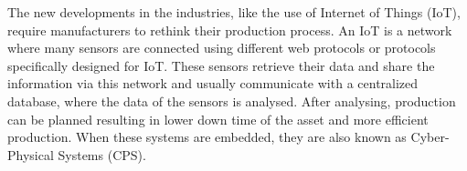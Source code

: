 The new developments in the industries, like the use of Internet of Things (IoT), require manufacturers to rethink their production process. An IoT is a network where many sensors are connected using different web protocols or protocols specifically designed for IoT. These sensors retrieve their data and share the information via this network and usually communicate with a centralized database, where the data of the sensors is analysed. After analysing, production can be planned resulting in lower down time of the asset and more efficient production. When these systems are embedded, they are also known as Cyber-Physical Systems (CPS). 



